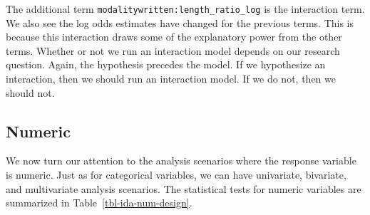 \documentclass[
  letterpaper,
]{latex/krantz}
\theoremstyle{definition}
\theoremstyle{remark}
\begin{document}
The additional term \texttt{modalitywritten:length\_ratio\_log} is the
interaction term. We also see the log odds estimates have changed for
the previous terms. This is because this interaction draws some of the
explanatory power from the other terms. Whether or not we run an
interaction model depends on our research question. Again, the
hypothesis precedes the model. If we hypothesize an interaction, then we
should run an interaction model. If we do not, then we should not.

\subsection{Numeric}\label{sec-ida-numeric}

We now turn our attention to the analysis scenarios where the response
variable is numeric. Just as for categorical variables, we can have
univariate, bivariate, and multivariate analysis scenarios. The
statistical tests for numeric variables are summarized in
Table~\ref{tbl-ida-num-design}.
\end{document}
